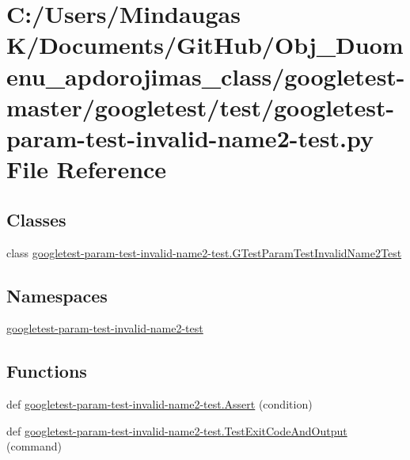 \hypertarget{googletest-master_2googletest_2test_2googletest-param-test-invalid-name2-test_8py}{}\section{C\+:/\+Users/\+Mindaugas K/\+Documents/\+Git\+Hub/\+Obj\+\_\+\+Duomenu\+\_\+apdorojimas\+\_\+class/googletest-\/master/googletest/test/googletest-\/param-\/test-\/invalid-\/name2-\/test.py File Reference}
\label{googletest-master_2googletest_2test_2googletest-param-test-invalid-name2-test_8py}
\subsection*{Classes}
\begin{DoxyCompactItemize}
\item 
class \mbox{\hyperlink{classgoogletest-param-test-invalid-name2-test_1_1_g_test_param_test_invalid_name2_test}{googletest-\/param-\/test-\/invalid-\/name2-\/test.\+G\+Test\+Param\+Test\+Invalid\+Name2\+Test}}
\end{DoxyCompactItemize}
\subsection*{Namespaces}
\begin{DoxyCompactItemize}
\item 
 \mbox{\hyperlink{namespacegoogletest-param-test-invalid-name2-test}{googletest-\/param-\/test-\/invalid-\/name2-\/test}}
\end{DoxyCompactItemize}
\subsection*{Functions}
\begin{DoxyCompactItemize}
\item 
def \mbox{\hyperlink{namespacegoogletest-param-test-invalid-name2-test_abce82484b5e340c0951436eab006fa2e}{googletest-\/param-\/test-\/invalid-\/name2-\/test.\+Assert}} (condition)
\item 
def \mbox{\hyperlink{namespacegoogletest-param-test-invalid-name2-test_a6897220a9a1986dd4bbef1ca9f0629bd}{googletest-\/param-\/test-\/invalid-\/name2-\/test.\+Test\+Exit\+Code\+And\+Output}} (command)
\end{DoxyCompactItemize}
